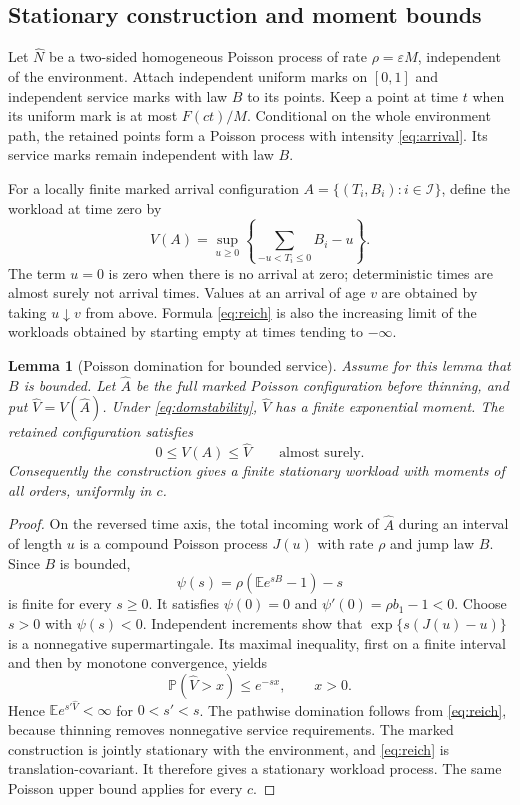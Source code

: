 \documentclass[aap,preprint]{imsart}
\numberwithin{equation}{section}
\theoremstyle{plain}
\newtheorem{lemma}[theorem]{Lemma}
\theoremstyle{definition}
\newcommand{\E}{\mathbb E}
\newcommand{\Pp}{\mathbb P}
\newcommand{\1}{\mathbf 1}
\newcommand{\eps}{\varepsilon}
\begin{document}
\subsection{Stationary construction and moment bounds}
Let $\widehat N$ be a two-sided homogeneous Poisson process of rate $\rho=\eps M$, independent of the environment. Attach independent uniform marks on $[0,1]$ and independent service marks with law $B$ to its points. Keep a point at time $t$ when its uniform mark is at most $F(ct)/M$. Conditional on the whole environment path, the retained points form a Poisson process with intensity \eqref{eq:arrival}. Its service marks remain independent with law $B$.

For a locally finite marked arrival configuration $A=\{(T_i,B_i):i\in\mathcal I\}$, define the workload at time zero by
\begin{equation}\label{eq:reich}
 V(A)=\sup_{u\ge0}\left\{\sum_{-u<T_i\le0}B_i-u\right\}.
\end{equation}
The term $u=0$ is zero when there is no arrival at zero; deterministic times are almost surely not arrival times. Values at an arrival of age $v$ are obtained by taking $u\downarrow v$ from above. Formula \eqref{eq:reich} is also the increasing limit of the workloads obtained by starting empty at times tending to $-\infty$.

\begin{lemma}[Poisson domination for bounded service]\label{lem:domination}
Assume for this lemma that $B$ is bounded. Let $\widehat A$ be the full marked Poisson configuration before thinning, and put $\widehat V=V(\widehat A)$. Under \eqref{eq:domstability}, $\widehat V$ has a finite exponential moment. The retained configuration satisfies
\[
 0\le V(A)\le\widehat V\qquad\text{almost surely}.
\]
Consequently the construction gives a finite stationary workload with moments of all orders, uniformly in $c$.
\end{lemma}
\begin{proof}
On the reversed time axis, the total incoming work of $\widehat A$ during an interval of length $u$ is a compound Poisson process $J(u)$ with rate $\rho$ and jump law $B$. Since $B$ is bounded,
\[
 \psi(s)=\rho(\E e^{sB}-1)-s
\]
is finite for every $s\ge0$. It satisfies $\psi(0)=0$ and $\psi'(0)=\rho b_1-1<0$. Choose $s>0$ with $\psi(s)<0$. Independent increments show that $\exp\{s(J(u)-u)\}$ is a nonnegative supermartingale. Its maximal inequality, first on a finite interval and then by monotone convergence, yields
\[
 \Pp(\widehat V>x)\le e^{-sx},\qquad x>0.
\]
Hence $\E e^{s'\widehat V}<\infty$ for $0<s'<s$. The pathwise domination follows from \eqref{eq:reich}, because thinning removes nonnegative service requirements. The marked construction is jointly stationary with the environment, and \eqref{eq:reich} is translation-covariant. It therefore gives a stationary workload process. The same Poisson upper bound applies for every $c$.
\end{proof}
\end{document}
